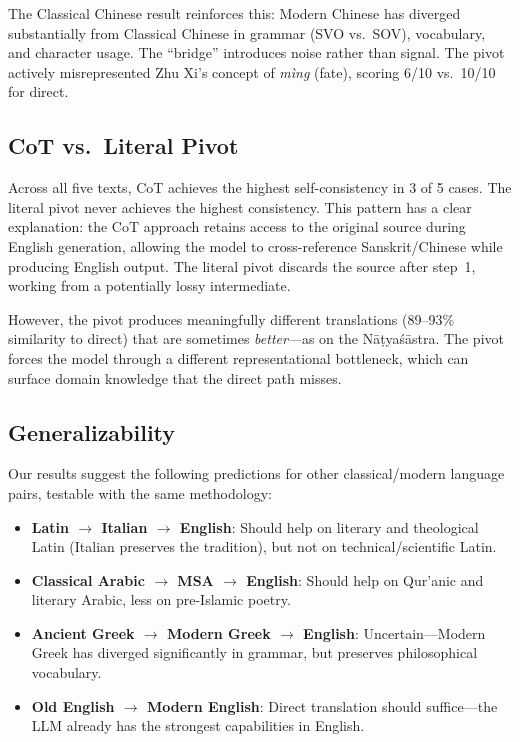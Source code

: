 \documentclass[10pt,twocolumn]{article}
\begin{document}
The Classical Chinese result reinforces this: Modern Chinese has diverged substantially from Classical Chinese in grammar (SVO vs.\ SOV), vocabulary, and character usage. The ``bridge'' introduces noise rather than signal. The pivot actively misrepresented Zhu Xi's concept of \emph{m\`ing} (fate), scoring 6/10 vs.\ 10/10 for direct.

\subsection{CoT vs.\ Literal Pivot}

Across all five texts, CoT achieves the highest self-consistency in 3 of 5 cases. The literal pivot never achieves the highest consistency. This pattern has a clear explanation: the CoT approach retains access to the original source during English generation, allowing the model to cross-reference Sanskrit/Chinese while producing English output. The literal pivot discards the source after step~1, working from a potentially lossy intermediate.

However, the pivot produces meaningfully different translations (89--93\% similarity to direct) that are sometimes \emph{better}---as on the N\=a\d{t}ya\'s\=astra. The pivot forces the model through a different representational bottleneck, which can surface domain knowledge that the direct path misses.

\subsection{Generalizability}

Our results suggest the following predictions for other classical/modern language pairs, testable with the same methodology:

\begin{itemize}
\item \textbf{Latin $\to$ Italian $\to$ English}: Should help on literary and theological Latin (Italian preserves the tradition), but not on technical/scientific Latin.
\item \textbf{Classical Arabic $\to$ MSA $\to$ English}: Should help on Qur'anic and literary Arabic, less on pre-Islamic poetry.
\item \textbf{Ancient Greek $\to$ Modern Greek $\to$ English}: Uncertain---Modern Greek has diverged significantly in grammar, but preserves philosophical vocabulary.
\item \textbf{Old English $\to$ Modern English}: Direct translation should suffice---the LLM already has the strongest capabilities in English.
\end{itemize}
\end{document}
